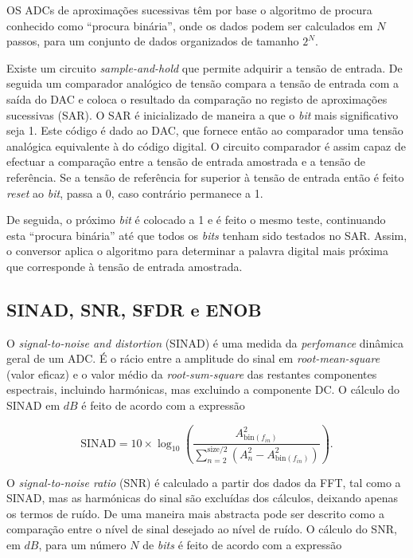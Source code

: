 \documentclass[11pt]{article}
\numberwithin{equation}{section}
\begin{document}
OS ADCs de aproximações sucessivas têm por base o algoritmo de procura conhecido como ``procura binária'', onde os dados podem ser calculados em $N$ passos, para um conjunto de dados organizados de tamanho $2^N$.

Existe um circuito \textit{sample-and-hold} que permite adquirir a tensão de entrada. De seguida um comparador analógico de tensão compara a tensão de entrada com a saída do DAC e coloca o resultado da comparação no registo de aproximações sucessivas (SAR). O SAR é inicializado de maneira a que o \textit{bit} mais significativo seja 1. Este código é dado ao DAC, que fornece então ao comparador uma tensão analógica equivalente à do código digital. O circuito comparador é assim capaz de efectuar a comparação entre a tensão de entrada amostrada e a tensão de referência. Se a tensão de referência for superior à tensão de entrada então é feito \textit{reset} ao \textit{bit}, passa a 0, caso contrário permanece a 1. 

De seguida, o próximo \textit{bit} é colocado a 1 e é feito o mesmo teste, continuando esta ``procura binária'' até que todos os \textit{bits} tenham sido testados no SAR. Assim, o conversor aplica o algoritmo para determinar a palavra digital mais próxima que corresponde à tensão de entrada amostrada.

\subsection{SINAD, SNR, SFDR e ENOB}

O \textit{signal-to-noise and distortion} (SINAD) é uma medida da \textit{perfomance} dinâmica geral de um ADC. É o rácio entre a amplitude do sinal em \textit{root-mean-square} (valor eficaz) e o valor médio da \textit{root-sum-square} das restantes componentes espectrais, incluindo harmónicas, mas excluindo a componente DC. O cálculo do SINAD em $dB$ é feito de acordo com a expressão

\vspace{-3mm}
\begin{equation}
\text{SINAD} = 10\times \log_{10} \left(\frac{A^{2}_{\text{bin}(f_{in})}}{\sum_{n=2}^{\text{size}/2}\left(A^{2}_{n} - A^{2}_{\text{bin}(f_{in})}\right)}\right).
\label{eq:SINAD}
\end{equation}

\vspace{1mm}
O \textit{signal-to-noise ratio} (SNR) é calculado a partir dos dados da FFT, tal como a SINAD, mas as harmónicas do sinal são excluídas dos cálculos, deixando apenas os termos de ruído. De uma maneira mais abstracta pode ser descrito como a comparação entre o nível de sinal desejado ao nível de ruído. O cálculo do SNR, em $dB$, para um número $N$ de \textit{bits} é feito de acordo com a expressão
\end{document}
